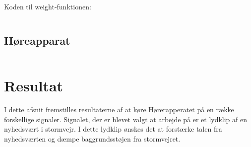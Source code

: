 Koden til weight-funktionen:
\begin{verbatim}

\end{verbatim}

\subsection{Høreapparat}
\begin{verbatim}

\end{verbatim}


\section{Resultat}
I dette afsnit fremstilles resultaterne af at køre Hørerapperatet på en række forskellige signaler. Signalet, der er blevet valgt at arbejde på er et lydklip af en nyhedsvært i stormvejr. I dette lydklip ønskes det at forstærke talen fra nyhedsværten og dæmpe baggrundsstøjen fra stormvejret.

